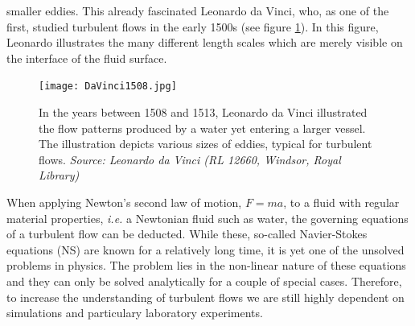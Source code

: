smaller eddies. This already fascinated Leonardo da Vinci, who, as one of
the first, studied turbulent flows in the early 1500s (see
figure \ref{fig:intro_davinci}). In this figure, Leonardo illustrates the many
different length scales which are merely visible on the interface of the fluid
surface.
\begin{figure}[h]
    \centering
    \texttt{[image: DaVinci1508.jpg]}
    \caption{In the years between 1508 and 1513, Leonardo da Vinci illustrated
    the flow patterns produced by a water yet entering a larger vessel. The
illustration depicts various sizes of eddies, typical for turbulent flows.
\textit{Source: Leonardo da Vinci (RL 12660, Windsor, Royal Library)}}
    \label{fig:intro_davinci}
\end{figure}

When applying Newton's second law of motion, $F=m a$, to a fluid with regular
material properties, \textit{i.e.} a Newtonian fluid such as water, the
governing equations of a turbulent flow can be deducted.  While these,
so-called Navier-Stokes equations (NS) are known for a relatively long time,
it is yet one of the unsolved problems in physics. The problem lies in the
non-linear nature of these equations and they can only be solved analytically
for a couple of special cases. Therefore, to increase the understanding of
turbulent flows we are still highly dependent on simulations and particulary
laboratory experiments. 
\newpage
